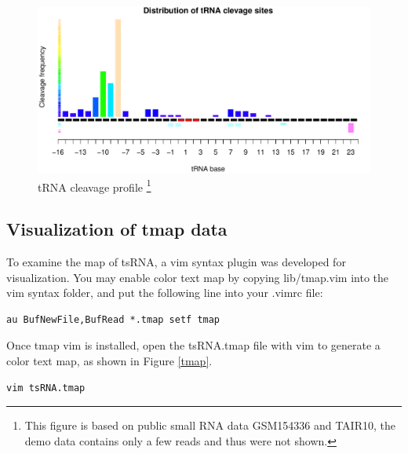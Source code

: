 \documentclass[11pt, a4paper]{article}
\begin{document}
\begin{figure}[htbp]
\begin{center}
\includegraphics[width=13cm]{cleavage_profile.pdf}
\caption[Caption for LOF]{tRNA cleavage profile \footnote{This figure is based on public small RNA data GSM154336 and TAIR10, the demo data contains only a few reads and thus were not shown.}}
\label{cleavage}
\end{center}
\end{figure}

\subsection{Visualization of tmap data}

To examine the map of tsRNA, a vim syntax plugin was developed for visualization. You may enable color text map by copying lib/tmap.vim into the vim syntax folder, and put the following line into your .vimrc file:

{\footnotesize \begin{tcolorbox}[colback=blue!5!white,colframe=blue!75!black,title=Set filetype tmap in vim]
\begin{verbatim}
au BufNewFile,BufRead *.tmap setf tmap
\end{verbatim}
\end{tcolorbox}}

Once tmap vim is installed, open the tsRNA.tmap file with vim to generate a color text map, as shown in Figure \ref{tmap}.

{\footnotesize \begin{tcolorbox}[colback=blue!5!white,colframe=blue!75!black,title=Visualization tsRNA.tmap]
\begin{verbatim}
vim tsRNA.tmap
\end{verbatim}
\end{tcolorbox}}
\end{document}

